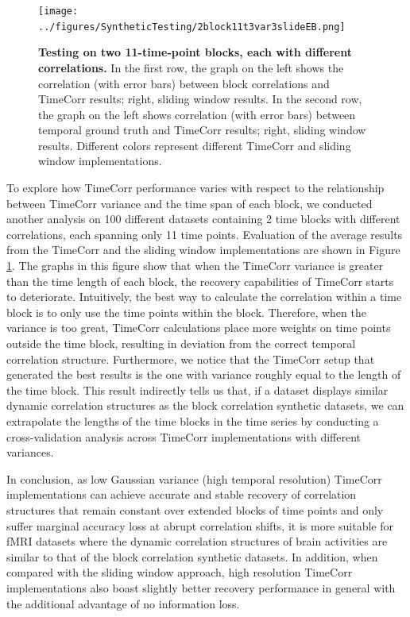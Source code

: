 \documentclass[11pt]{article}
\begin{document}
\begin{enumerate}
\begin{figure}[!htb]
\texttt{[image: ../figures/SyntheticTesting/2block11t3var3slideEB.png]}
\caption{\textbf{Testing on two 11-time-point blocks, each with different correlations.} In the first row, the graph on the left shows the correlation (with error bars) between block correlations and TimeCorr results; right, sliding window results. In the second row, the graph on the left shows correlation (with error bars) between temporal ground truth and TimeCorr results; right, sliding window results. Different colors represent different TimeCorr and sliding window implementations.}
\label{fig:2block11t}
\end{figure}

To explore how TimeCorr performance varies with respect to the relationship between TimeCorr variance and the time span of each block, we conducted another analysis on 100 different datasets containing 2 time blocks with different correlations, each spanning only 11 time points. Evaluation of the average results from the TimeCorr and the sliding window implementations are shown in Figure \ref{fig:2block11t}. The graphs in this figure show that when the TimeCorr variance is greater than the time length of each block, the recovery capabilities of TimeCorr starts to deteriorate. Intuitively, the best way to calculate the correlation within a time block is to only use the time points within the block. Therefore, when the variance is too great, TimeCorr calculations place more weights on time points outside the time block, resulting in deviation from the correct temporal correlation structure. Furthermore, we notice that the TimeCorr setup that generated the best results is the one with variance roughly equal to the length of the time block. This result indirectly tells us that, if a dataset displays similar dynamic correlation structures as the block correlation synthetic datasets, we can extrapolate the lengths of the time blocks in the time series by conducting a cross-validation analysis across TimeCorr implementations with different variances.

In conclusion, as low Gaussian variance (high temporal resolution) TimeCorr implementations can achieve accurate and stable recovery of correlation structures that remain constant over extended blocks of time points and only suffer marginal accuracy loss at abrupt correlation shifts, it is more suitable for fMRI datasets where the dynamic correlation structures of brain activities are similar to that of the block correlation synthetic datasets. In addition, when compared with the sliding window approach, high resolution TimeCorr implementations also boast slightly better recovery performance in general with the additional advantage of no information loss.


\end{enumerate}
\end{document}
